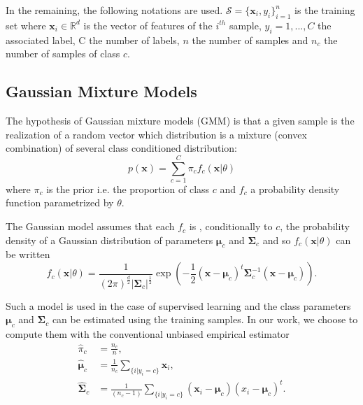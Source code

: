 \documentclass[a4paper,11pt,DIV=16]{scrartcl}
\begin{document}
In the remaining, the following notations are used. $\mathcal{S} = \{\mathbf{x}_i,y_i\}_{i=1}^{n}$ is the training set where $\mathbf{x}_i \in \mathbb{R}^d$ is the vector of features of the $i^{th}$ sample, $y_i = 1,...,C$ the associated label, C the number of labels, $n$ the number of samples and $n_c$ the number of samples of class $c$.

    \subsection{Gaussian Mixture Models}

    The hypothesis of Gaussian mixture models (GMM) is that a given sample is the realization of a random vector which distribution is a mixture (convex combination) of several class conditioned distribution:
    \begin{equation}
        p(\mathbf{x}) = \sum_{c=1}^{C} \pi_c f_c(\mathbf{x}|\theta)
    \end{equation}
    where $\pi_c$ is the prior i.e. the proportion of class $c$ and $f_c$ a probability density function parametrized by $\theta$.

    The Gaussian model assumes that each $f_c$ is , conditionally to $c$, the probability density of a Gaussian distribution of parameters $\boldsymbol{\mu}_c$ and $\boldsymbol{\Sigma}_c$ and so $f_c(\mathbf{x}|\theta)$ can be written
    \begin{equation*}
        f_c(\mathbf{x}|\theta) = \frac{1}{(2\pi)^{\frac{d}{2}} |\boldsymbol{\Sigma}_c|^{\frac{1}{2}}} \exp \left( -\frac{1}{2} (\mathbf{x} - \boldsymbol{\mu}_c)^t \boldsymbol{\Sigma}_c^{-1} (\mathbf{x} - \boldsymbol{\mu}_c) \right).
    \end{equation*}

    Such a model is used in the case of supervised learning and the class parameters $\boldsymbol{\mu}_c$ and $\boldsymbol{\Sigma}_c$ can be estimated using the training samples. In our work, we choose to compute them with the conventional unbiased empirical estimator
    \begin{align}
        \hat{\pi}_c &= \frac{n_c}{n},\\
        \hat{\boldsymbol{\mu}}_c &= \frac{1}{n_c} \sum_{\{i|y_i = c\}} \mathbf{x}_i ,\\
        \hat{\boldsymbol{\Sigma}}_c &= \frac{1}{(n_c - 1)} \sum_{\{i|y_i = c\}} (\mathbf{x}_i - \boldsymbol{\mu}_c) (\boldsymbol{}x_i - \boldsymbol{\mu}_c)^t.
    \end{align}
\end{document}
